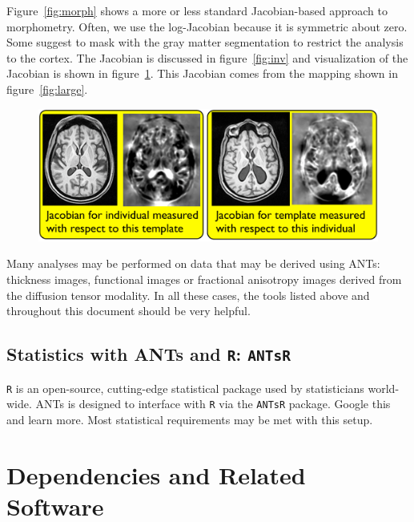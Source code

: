 \documentclass{InsightArticle}
\begin{document}
Figure~\ref{fig:morph} shows a more or less standard Jacobian-based approach to morphometry.
Often, we use the log-Jacobian because it is symmetric about zero.
Some suggest to mask with the gray matter segmentation to restrict the analysis to the
cortex.  The Jacobian is discussed in figure~\ref{fig:inv} and visualization of
the Jacobian is shown in figure~\ref{fig:jac}.  This Jacobian comes
from the mapping shown in figure~\ref{fig:large}.
\begin{figure}
\includegraphics[width=1\textwidth]{Figures/Jacobian.pdf}
\label{fig:jac}
\end{figure}
Many analyses may be performed on data that may be derived using ANTs:
thickness images, functional images or fractional anisotropy images derived from the diffusion 
tensor modality.  In all these cases, the tools listed above and
throughout this document should be very helpful.

\subsection{Statistics with ANTs and \texttt{R}: \texttt{ANTsR} }
\texttt{R} is an open-source, cutting-edge statistical package 
used by statisticians world-wide.   ANTs is designed to 
interface with \texttt{R} via the \texttt{ANTsR} package.  Google
this and learn more. Most statistical requirements may be met with this setup. 
\newpage
\section{Dependencies and Related Software}
\end{document}
